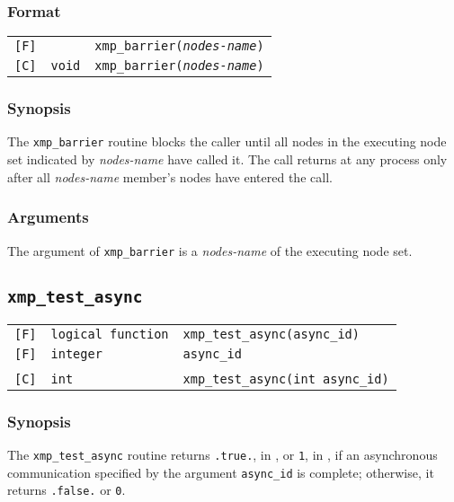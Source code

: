 \subsubsection*{Format}

\begin{tabular}{lll}

\verb![F]!&  & {\tt xmp\_barrier({\it nodes-name})}\\

\verb![C]!&  {\tt void}& {\tt  xmp\_barrier({\it nodes-name})}

\end{tabular}

\subsubsection*{Synopsis}
    The {\tt xmp\_barrier} routine blocks the caller until all nodes in the executing node set 
    indicated by {\it nodes-name} have called it.
    The call returns at any process only after all {\it nodes-name} member's nodes
    have entered the call.

\subsubsection*{Arguments}
    The argument of {\tt xmp\_barrier} is a {\it nodes-name} of the executing node set.

\vspace{0.3cm}

\subsection{\tt xmp\_test\_async}

\begin{tabular}{lll}

\verb![F]!& {\tt logical function} & {\tt xmp\_test\_async(async\_id)}\\
\verb![F]!& {\tt integer} & {\tt async\_id}\\
          & & \\
\verb![C]!&  {\tt int} & {\tt  xmp\_test\_async(int async\_id)}

\end{tabular}

\subsubsection*{Synopsis}

The {\tt xmp\_test\_async} routine returns {\tt .true.}, in {\XMPF}, or
{\tt 1}, in {\XMPC}, if an asynchronous communication specified by the
argument {\tt async\_id} is complete; otherwise, it returns {\tt .false.}
or {\tt 0}.

